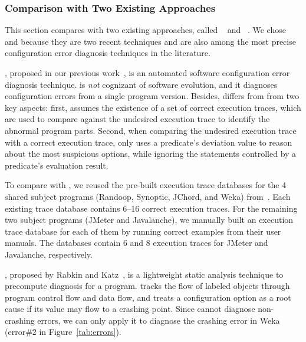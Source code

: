 \subsubsection{Comparison with Two Existing Approaches}
\label{sec:existing}

This section compares \ourtool with two existing approaches,
called \prevtool~\cite{Zhang:2013:ADS} and \conftool~\cite{Rabkin:2011:PPC}.
We chose \prevtool and \conftool because
they are two recent techniques and are also among the most
precise configuration error diagnosis techniques in the literature.


\noindent\textbf{\prevtoolnoxspace}, proposed in our previous work~\cite{Zhang:2013:ADS},
is an automated
software configuration error diagnosis technique. %
\prevtool is \textit{not} cognizant of
software evolution, and it diagnoses configuration errors from
a single program version.
Besides, \prevtool differs from \ourtool from two key aspects:
first, \prevtool assumes the existence of a set of correct execution
traces, which are used to compare against the undesired
execution trace to identify the abnormal program parts.
Second, when comparing the undesired execution trace with a
correct execution trace, \prevtool only uses a predicate's deviation
value to reason about the most suspicious options, while
ignoring the statements controlled by a predicate's evaluation result. 

To compare \ourtool with \prevtool, 
we reused the pre-built execution trace databases
for the 4 shared subject programs (Randoop, Synoptic, JChord, and Weka)
from~\cite{Zhang:2013:ADS}.
Each existing trace database contains 6--16 correct
execution traces.
For the remaining two subject programs (JMeter and
Javalanche), we manually built an execution trace database
for each of them by running correct examples from their user manuals.
The databases contain 6 and 8
execution traces for JMeter and Javalanche, respectively.

\vspace{1mm}

\noindent \textbf{\conftoolnoxspace}, proposed by Rabkin and
Katz~\cite{Rabkin:2011:PPC}, is a lightweight
static analysis technique to precompute diagnosis for a program.
\conftool tracks the flow of labeled objects through 
program control flow and data flow, and treats a configuration option
as a root cause if its value may flow to a crashing point.
Since \conftool cannot diagnose non-crashing errors, we
can only apply it to diagnose the crashing error in
Weka (error\#2 in Figure~\ref{tab:errors}).


